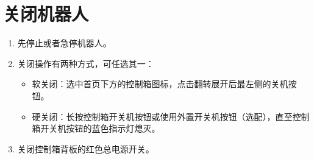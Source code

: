 \section{关闭机器人}
\begin{enumerate}
	\item 先停止或者急停机器人。 
	\item 关闭操作有两种方式，可任选其一： 
	\begin{itemize}
	\item 软关闭：选中\LM 首页下方的控制箱图标，点击翻转展开后最左侧的关机按钮。
	\item 硬关闭：长按控制箱开关机按钮或使用外置开关机按钮（选配），直至控制箱开关机按钮的蓝色指示灯熄灭。 
		\end{itemize}
	\item 关闭控制箱背板的红色总电源开关。 
\end{enumerate}




